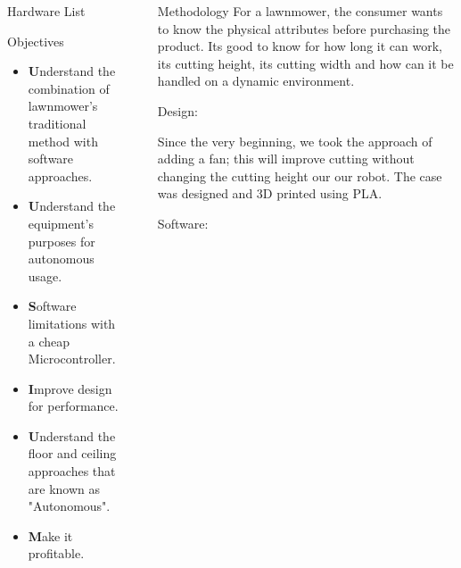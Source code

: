 \documentclass[final]{beamer}
\newlength{\sepwidth}
\newlength{\colwidth}
\newcommand{\separatorcolumn}{\begin{column}{\sepwidth}\end{column}}
\begin{document}
\begin{frame}[t]
\begin{columns}[t]
\begin{column}{\colwidth}
\begin{block}{Hardware List}
    

  \end{block}

  \begin{block}{Objectives}
    \begin{itemize}
      \item \textbf Understand the combination of lawnmower's traditional method with software approaches.
      \item \textbf Understand the equipment's purposes for autonomous usage.
      \item \textbf Software limitations with a cheap Microcontroller.
      \item \textbf Improve design for performance.
      \item \textbf Understand the floor and ceiling approaches that are known as "Autonomous".
      \item \textbf Make it profitable.
    \end{itemize}

  \end{block}

\end{column}

\separatorcolumn

\begin{column}{\colwidth}

  \begin{block}{Methodology}
  For a lawnmower, the consumer wants to know the physical attributes before purchasing the product. Its good to know for how long it can work, its cutting height, its cutting width and how can it be handled on a dynamic environment.
  \begin{heading}{Design:}
  \end{heading}

    Since the very beginning, we took the approach of adding a fan; this will improve cutting without changing the cutting height our our robot. The case was designed and 3D printed using PLA.

  \begin{heading}{Software:}
  \end{heading}


\end{block}
\end{column}
\end{columns}
\end{frame}
\end{document}
